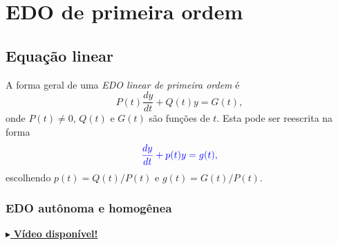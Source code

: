 
\chapter{EDO de primeira ordem}\label{cap_edo1ordem}
\thispagestyle{fancy}

\section{Equação linear}\label{cap_edo1ordem_sec_eqlinear}

A forma geral de uma \emph{EDO linear de primeira ordem} é
\begin{equation}
  P(t)\frac{dy}{dt} + Q(t)y = G(t),
\end{equation}
onde $P(t) \neq 0$, $Q(t)$ e $G(t)$ são funções de $t$. Esta pode ser reescrita na forma
\begin{equation}
  \color{blue}{\frac{dy}{dt} + p(t)y = g(t)},
\end{equation}
escolhendo $p(t) = Q(t)/P(t)$ e $g(t) = G(t)/P(t)$.

\subsection{EDO autônoma e homogênea}

\begin{flushright}
  \href{https://archive.org/details/metodo-de-solucao-edo-ordem-1-linear-coeficientes-constantes-homogenea_20200421}{$\blacktriangleright$ \bf Vídeo disponível!}
\end{flushright}


